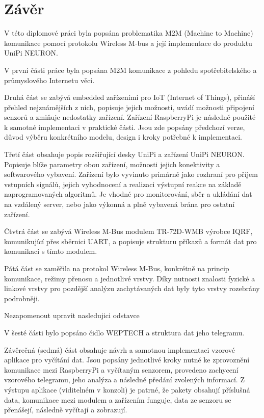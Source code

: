 \chapter{Závěr}

V této diplomové práci byla popsána problematika M2M (Machine to Machine) komunikace pomocí protokolu Wireless M-bus a její implementace do produktu UniPi NEURON.


V první části práce byla popsána M2M komunikace z pohledu spotřebitelského a průmyslového Internetu věcí.

Druhá část se zabývá embedded zařízeními pro IoT (Internet of Things), přináší přehled nejznámějších z nich, popisuje jejich možnosti, uvádí možnosti připojení senzorů a zmiňuje nedostatky zařízení. Zařízení RaspberryPi je následně použité k samotné implementaci v praktické části. Jsou zde popsány předchozí verze, důvod výběru konkrétního modelu, design i kroky potřebné k implementaci.

Třetí část obsahuje popis rozšiřující desky UniPi a zařízení UniPi NEURON. Popisuje blíže parametry obou zařízení, možnosti jejich konektivity a softwarového vybavení. Zařízení bylo vyvinuto primárně jako rozhraní pro příjem vstupních signálů, jejich vyhodnocení a realizaci výstupní reakce na základě naprogramovaných algoritmů. Je vhodné pro monitorování, sběr a ukládání dat na vzdálený server, nebo jako výkonná a plně vybavená brána pro ostatní zařízení.

Čtvtrá část se zabývá Wireless M-Bus modulem TR-72D-WMB výrobce IQRF, komunikující přes sběrnici UART, a popisuje strukturu příkazů a formát dat pro komunikaci s tímto modulem.

Pátá část se zaměřila na protokol Wireless M-Bus, konkrétně na princip komunikace, režimy přenosu a jednotlivé vrstvy. 
Díky nutnosti znalosti fyzické a linkové vrstvy pro pozdější analýzu zachytávaných dat byly tyto vrstvy rozebrány podrobněji. 

\colorbox[rgb]{0,1,0}{Nezapomenout upravit nasledujici odstavce}

V šesté části bylo popsáno čidlo WEPTECH a struktura dat jeho telegramu.

Závěrečná (sedmá) část obsahuje návrh a samotnou implementaci vzorové aplikace pro vyčítání dat. Jsou popsány jednotlivé kroky nutné ke zprovoznění komunikace mezi RaspberryPi a vyčítaným senzorem, provedeno zachycení vzorového telegramu, jeho analýza a následné předání zvolených informací. Z výstupu aplikace (viditelném v konzoli) je patrné, že pakety obsahují příslušná data, komunikace mezi modulem a zařízením funguje, data ze senzoru se přenášejí, následně vyčítají a zobrazují.


